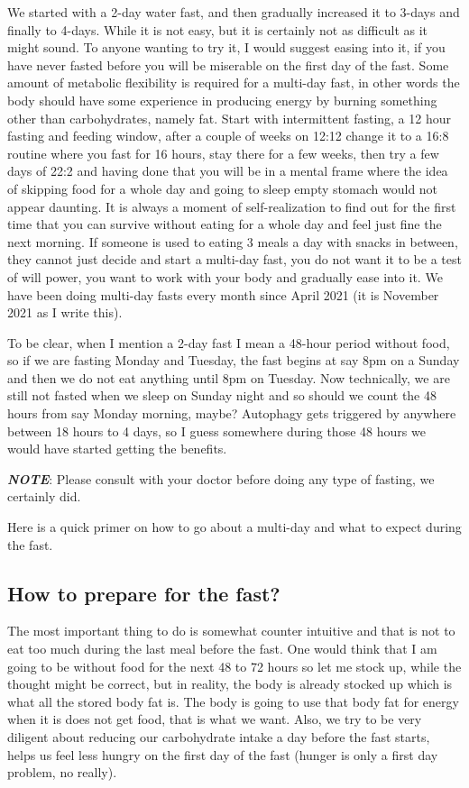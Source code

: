 \documentclass[
  oneside]{book}
\begin{document}
We started with a 2-day water fast, and then gradually increased it to 3-days and finally to 4-days. While it is not easy, but it is certainly not as difficult as it might sound. To anyone wanting to try it, I would suggest easing into it, if you have never fasted before you will be miserable on the first day of the fast. Some amount of metabolic flexibility is required for a multi-day fast, in other words the body should have some experience in producing energy by burning something other than carbohydrates, namely fat. Start with intermittent fasting, a 12 hour fasting and feeding window, after a couple of weeks on 12:12 change it to a 16:8 routine where you fast for 16 hours, stay there for a few weeks, then try a few days of 22:2 and having done that you will be in a mental frame where the idea of skipping food for a whole day and going to sleep empty stomach would not appear daunting. It is always a moment of self-realization to find out for the first time that you can survive without eating for a whole day and feel just fine the next morning. If someone is used to eating 3 meals a day with snacks in between, they cannot just decide and start a multi-day fast, you do not want it to be a test of will power, you want to work with your body and gradually ease into it. We have been doing multi-day fasts every month since April 2021 (it is November 2021 as I write this).

To be clear, when I mention a 2-day fast I mean a 48-hour period without food, so if we are fasting Monday and Tuesday, the fast begins at say 8pm on a Sunday and then we do not eat anything until 8pm on Tuesday. Now technically, we are still not fasted when we sleep on Sunday night and so should we count the 48 hours from say Monday morning, maybe? Autophagy gets triggered by anywhere between 18 hours to 4 days, so I guess somewhere during those 48 hours we would have started getting the benefits.

\textbf{\emph{NOTE}}: Please consult with your doctor before doing any type of fasting, we certainly did.

Here is a quick primer on how to go about a multi-day and what to expect during the fast.

\hypertarget{how-to-prepare-for-the-fast}{%
\subsection{How to prepare for the fast?}\label{how-to-prepare-for-the-fast}}

The most important thing to do is somewhat counter intuitive and that is not to eat too much during the last meal before the fast. One would think that I am going to be without food for the next 48 to 72 hours so let me stock up, while the thought might be correct, but in reality, the body is already stocked up which is what all the stored body fat is. The body is going to use that body fat for energy when it is does not get food, that is what we want. Also, we try to be very diligent about reducing our carbohydrate intake a day before the fast starts, helps us feel less hungry on the first day of the fast (hunger is only a first day problem, no really).
\end{document}

